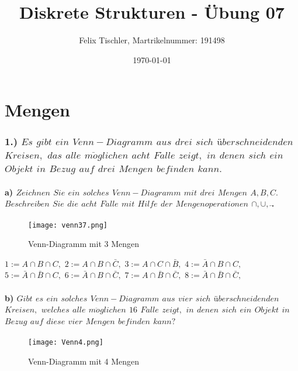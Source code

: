 \documentclass[titlepage]{article}
\newcommand{\1}{\mathbb{1}}
\newcommand{\0}{\mathbb{0}}
\begin{document}
	
	\title{Diskrete Strukturen - Übung 07}
	\author{Felix Tischler, Martrikelnummer: 191498}
	\date{\today}
	\maketitle
	
	\part*{Mengen}
	\section*{1.) $Es$ $gibt$ $ein$ $Venn-Diagramm$ $aus$ $drei$ $sich$ $überschneidenden$ $Kreisen,$ $das$ $alle$	$m\ddot oglichen$ $acht$ $F\ddot alle$ $zeigt,$ $in$ $denen$ $sich$ $ein$ $Objekt$ $in$ $Bezug$ $auf$ $drei$ $Mengen$	$befinden$ $kann.$}
		\subsection*{a) $Zeichnen$ $Sie$ $ein$ $solches$ $Venn-Diagramm$ $mit$ $drei$ $Mengen$ $A, B, C.$ $Beschreiben$ $Sie$ $die$ $acht$ $F\ddot alle$ $mit$ $Hilfe$ $der$ $Mengenoperationen$ $\cap,\cup,\bar\,$.}
		\begin{figure}[htbp]
			\centering
			\texttt{[image: venn37.png]}
			\caption{Venn-Diagramm mit 3 Mengen}
		\end{figure}
			\noindent
			\begin{center}
				\centering
				$1:=A\cap B\cap C,$ $2:=A\cap B\cap\bar C,$ $3:=A\cap C\cap\bar B,$ $4:=\bar A\cap B\cap C,$\\$5:=\bar A\cap\bar B\cap C,$ $6:=\bar A\cap B\cap\bar C,$ $7:=A\cap\bar B\cap\bar C,$ $8:=\bar A\cap\bar B\cap\bar C,$
			\end{center}
		
		\subsection*{b) $Gibt$ $es$ $ein$ $solches$ $Venn-Diagramm$ $aus$ $vier$ $sich$ $überschneidenden$ $Kreisen,$ $welches$ $alle$ $m\ddot oglichen$ $16$ $F\ddot alle$ $zeigt,$ $in$ $denen$ $sich$ $ein$ $Objekt$ $in$ $Bezug$ $auf$ $diese$ $vier$ $Mengen$ $befinden$ $kann?$}
		\begin{figure}[htbp]
			\centering
			\texttt{[image: Venn4.png]}
			\caption{Venn-Diagramm mit 4 Mengen}
		\end{figure}
	
\end{document}
